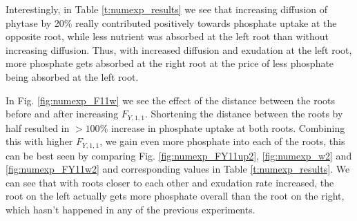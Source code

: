 \documentclass[11pt]{article}
\numberwithin{equation}{section}
\begin{document}
Interestingly, in Table \ref{t:numexp_results} we see that increasing diffusion of phytase by 20\% really contributed positively towards phosphate uptake at the opposite root, while less nutrient was absorbed at the left root than without increasing diffusion. Thus, with increased diffusion and exudation at the left root, more phosphate gets absorbed at the right root at the price of less phosphate being absorbed at the left root.

In Fig. \ref{fig:numexp_F11w} we see the effect of the distance between the roots before and after increasing $F_{Y,1,1}$. Shortening the distance between the roots by half resulted in $>100\%$ increase in phosphate uptake at both roots. Combining this with higher $F_{Y,1,1}$, we gain even more phosphate into each of the roots, this can be best seen by comparing Fig. \ref{fig:numexp_FY11up2}, \ref{fig:numexp_w2} and \ref{fig:numexp_FY11w2} and corresponding values in Table \ref{t:numexp_results}. We can see that with roots closer to each other and exudation rate increased, the root on the left actually gets more phosphate overall than the root on the right, which hasn't happened in any of the previous experiments.
\end{document}
